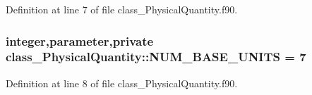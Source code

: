 Definition at line 7 of file class\_\-PhysicalQuantity.f90.

\hypertarget{namespaceclass__PhysicalQuantity_a2e10d9a38cddedc3b7705d597476550f}{
\subsubsection[{NUM\_\-BASE\_\-UNITS}]{\setlength{\rightskip}{0pt plus 5cm}integer,parameter,private {\bf class\_\-PhysicalQuantity::NUM\_\-BASE\_\-UNITS} = 7}}
\label{namespaceclass__PhysicalQuantity_a2e10d9a38cddedc3b7705d597476550f}


Definition at line 8 of file class\_\-PhysicalQuantity.f90.

